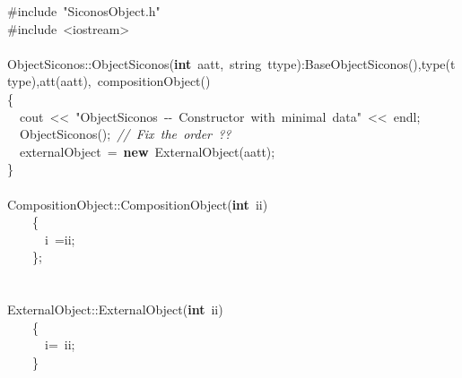 {\ttfamily \raggedright \small
\ \\
\ \\
\ \\
\ \\
\ \\
\ \\
\ \\
\ \\
\ \\
\ \\
\ \\
\ \\
\ \\
\ \\
\ \\
\ \\
\ \\
\#include\ "{}SiconosObject.h"{}\\
\#include\ <{}iostream>{}\\
\ \\
ObjectSiconos::ObjectSiconos(\textbf{int}\ aatt,\ string\ ttype):BaseObjectSiconos(),type(ttype),att(aatt),\ compositionObject()\\
\{\\
\ \ cout\ <{}<{}\ "{}ObjectSiconos\ -{}-{}\ Constructor\ with\ minimal\ data"{}\ <{}<{}\ endl;\\
\ \ ObjectSiconos();\ \textsl{//\ Fix\ the\ order\ ??}\\
\ \ externalObject\ =\ \textbf{new}\ ExternalObject(aatt);\\
\}\\
\ \\
CompositionObject::CompositionObject(\textbf{int}\ ii)\\
\ \ \ \ \{\\
\ \ \ \ \ \ i\ =ii;\\
\ \ \ \ \};\\
\ \\
\ \\
ExternalObject::ExternalObject(\textbf{int}\ ii)\\
\ \ \ \ \{\\
\ \ \ \ \ \ i=\ ii;\\
\ \ \ \ \}\\
\ \\
\ \\
 }
\normalfont\normalsize

